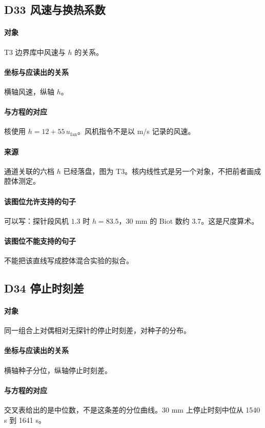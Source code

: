 \subsection{D33 风速与换热系数}
\paragraph{对象}
T3 边界库中风速与 $h$ 的关系。

\paragraph{坐标与应读出的关系}
横轴风速，纵轴 $h$。

\paragraph{与方程的对应}
核使用 $h=12+55\,u_{\mathrm{fan}}$。风机指令不是以 m/s 记录的风速。

\paragraph{来源}
通道关联的六档 \(h\) 已经落盘，图为 T3。核内线性式是另一个对象，不把前者画成腔体测定。

\paragraph{该图位允许支持的句子}
可以写：探针段风机 $1.3$ 时 $h=83.5$，30 mm 的 Biot 数约 $3.7$。这是尺度算术。

\paragraph{该图位不能支持的句子}
不能把该直线写成腔体混合实验的拟合。

\subsection{D34 停止时刻差}
\paragraph{对象}
同一组合上对偶相对无探针的停止时刻差，对种子的分布。

\paragraph{坐标与应读出的关系}
横轴种子分位，纵轴停止时刻差。

\paragraph{与方程的对应}
交叉表给出的是中位数，不是这条差的分位曲线。30 mm 上停止时刻中位从 1540 s 到 1641 s。

